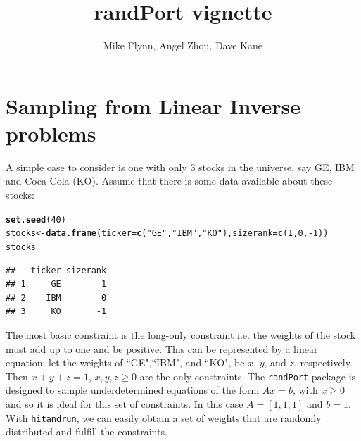 \documentclass{article}\usepackage{graphicx, color}
\makeatletter
\newcommand{\hlfunctioncall}[1]{\textcolor[rgb]{0.501960784313725,0,0.329411764705882}{\textbf{#1}}}%
\newcommand{\hlstring}[1]{\textcolor[rgb]{0.6,0.6,1}{#1}}%
\newenvironment{kframe}{%
 \def\at@end@of@kframe{}%
 \ifinner\ifhmode%
  \def\at@end@of@kframe{\end{minipage}}%
  \begin{minipage}{\columnwidth}%
 \fi\fi%
 \def\FrameCommand##1{\hskip\@totalleftmargin \hskip-\fboxsep
 \colorbox{shadecolor}{##1}\hskip-\fboxsep
     \hskip-\linewidth \hskip-\@totalleftmargin \hskip\columnwidth}%
 \MakeFramed {\advance\hsize-\width
   \@totalleftmargin\z@ \linewidth\hsize
   \@setminipage}}%
 {\par\unskip\endMakeFramed%
 \at@end@of@kframe}
\newenvironment{knitrout}{}{} %
\makeatother
\begin{document}
\title{randPort vignette}
\author{Mike Flynn, Angel Zhou, Dave Kane}
\maketitle

\section*{Sampling from Linear Inverse problems}




A simple case to consider is one with only 3 stocks in the universe, say GE, IBM and Coca-Cola (KO). Assume that there is some data available about these stocks:

\begin{knitrout}
\color{fgcolor}\begin{kframe}
\begin{alltt}
\hlfunctioncall{set.seed}(40)
stocks <- \hlfunctioncall{data.frame}(ticker = \hlfunctioncall{c}(\hlstring{"GE"}, \hlstring{"IBM"}, \hlstring{"KO"}), sizerank = \hlfunctioncall{c}(1, 0, -1))
stocks
\end{alltt}
\begin{verbatim}
##   ticker sizerank
## 1     GE        1
## 2    IBM        0
## 3     KO       -1
\end{verbatim}
\end{kframe}
\end{knitrout}


The most basic constraint is the long-only constraint i.e. the weights of the stock must add up to one and be positive. This can be represented by a linear equation: let the weights of ``GE",``IBM", and ``KO", be $x$, $y$, and $z$, respectively. Then $x+y+z =1$, $x,y,z \ge 0$ are the only constraints. The \verb+randPort+ package is designed to sample underdetermined equations of the form $Ax=b$, with $x \ge 0$ and so it is ideal for this set of constraints. In this case $A = [1,1,1]$ and $b = 1$. With \verb+hitandrun+, we can easily obtain a set of weights that are randomly distributed and fulfill the constraints. 
\end{document}
